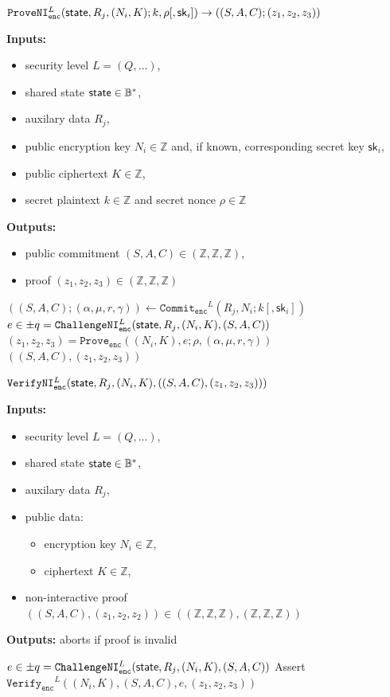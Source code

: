 \documentclass[11pt]{article}
\newenvironment{inlineAlgorithm}{}{}
\newcommand{\algoName}[1]{#1 \par}
\newcommand{\algoInputsList}[1]{
    {\small \bf Inputs:} 
        \begin{itemize}[noitemsep,topsep=0pt]
            #1
        \end{itemize}
}
\newcommand{\algoOutputs}[1]{
    {\small \bf Outputs:} #1 \par
}
\newcommand{\algoOutputsList}[1]{
    {\small \bf Outputs:}
        \begin{itemize}[noitemsep,topsep=0pt]
            #1
        \end{itemize}
}
\def\state{{\sf state}}
\newcommand{\commit}[1]{\ensuremath{\mathtt{Commit}_{\mathtt{#1}}}}
\newcommand{\challengeni}[1]{\ensuremath{\mathtt{ChallengeNI}_{\mathtt{#1}}}}
\newcommand{\prove}[1]{\ensuremath{\mathtt{Prove}_{\mathtt{#1}}}}
\newcommand{\proveni}[1]{\ensuremath{\mathtt{ProveNI}_{\mathtt{#1}}}}
\newcommand{\verify}[1]{\ensuremath{\mathtt{Verify}_{\mathtt{#1}}}}
\newcommand{\verifyni}[1]{\ensuremath{\mathtt{VerifyNI}_{\mathtt{#1}}}}
\newcommand{\sk}{\textsf{sk}}
\newcommand{\Z}{\mathbb{Z}}
\newcommand{\?}[1]{\stackrel{?}{#1}}
\newcommand{\Byte}{\ensuremath{\mathbb{B}}}
\begin{document}
\begin{description}

\item
\begin{inlineAlgorithm}
\algoName{$\proveni{enc}^L(\state, R_j, (N_i, K); k, \rho[, \sk_i]) \to ((S, A, C); (z_1, z_2, z_3))$}
\algoInputsList{
    \item security level $L = (Q, \dots)$,
    \item shared state $\state \in \Byte^*$,
    \item auxilary data $R_j$,
    \item public encryption key $N_i \in \Z$ and, if known, corresponding secret key $\sk_i$,
    \item public ciphertext $K \in \Z$,
    \item secret plaintext $k \in \Z$ and secret nonce $\rho \in \Z$
}
\algoOutputsList{
    \item public commitment $(S, A, C) \in (\Z, \Z, \Z)$,
    \item proof $(z_1, z_2, z_3) \in (\Z, \Z, \Z)$
}
\begin{algorithmic}[1]
\State $((S, A, C); (\alpha, \mu, r, \gamma)) \gets \commit{enc}^L(R_j, N_i; k[, \sk_i])$
\State $e \in \pm q = \challengeni{enc}^L(\state, R_j, (N_i, K), (S, A, C))$
\State $(z_1, z_2, z_3) = \prove{enc}((N_i, K), e; \rho, (\alpha, \mu, r, \gamma))$
\State \Return $((S, A, C), (z_1, z_2, z_3))$
\end{algorithmic}
\end{inlineAlgorithm}

\item
\begin{inlineAlgorithm}
\algoName{$\verifyni{enc}^L(\state, R_j, (N_i, K), ((S, A, C), (z_1, z_2, z_3)))$}
\algoInputsList{
    \item security level $L = (Q, \dots)$,
    \item shared state $\state \in \Byte^*$,
    \item auxilary data $R_j$,
    \item public data:
        \begin{itemize}
        \item encryption key $N_i \in \Z$,
        \item ciphertext $K \in \Z$,
        \end{itemize}
    \item non-interactive proof $((S, A, C), (z_1, z_2, z_2)) \in ((\Z, \Z, \Z), (\Z, \Z, \Z))$
}
\algoOutputs{aborts if proof is invalid}
\begin{algorithmic}[1]
\State $e \in \pm q = \challengeni{enc}^L(\state, R_j, (N_i, K), (S, A, C))$
\State Assert $\verify{enc}^L((N_i, K), (S, A, C), e, (z_1, z_2, z_3))$
\end{algorithmic}
\end{inlineAlgorithm}

\end{description}
\end{document}
